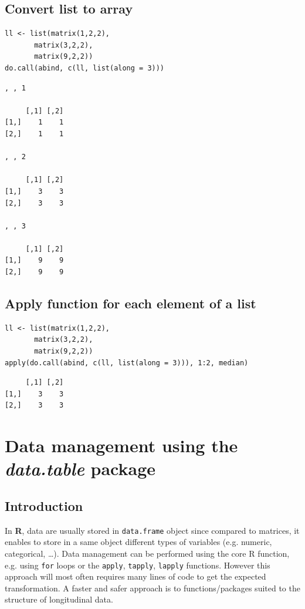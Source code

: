 \documentclass{article}
\newcommand\Rlogo{\textbf{\textsf{R}}\xspace}
\begin{document}
\subsection{Convert list to array}
\label{sec:org980b1db}

\lstset{language=r,label= ,caption= ,captionpos=b,numbers=none}
\begin{lstlisting}
ll <- list(matrix(1,2,2),
	   matrix(3,2,2),
	   matrix(9,2,2))
do.call(abind, c(ll, list(along = 3)))
\end{lstlisting}

\begin{verbatim}
, , 1

     [,1] [,2]
[1,]    1    1
[2,]    1    1

, , 2

     [,1] [,2]
[1,]    3    3
[2,]    3    3

, , 3

     [,1] [,2]
[1,]    9    9
[2,]    9    9
\end{verbatim}

\subsection{Apply function for each element of a list}
\label{sec:org0426606}


\lstset{language=r,label= ,caption= ,captionpos=b,numbers=none}
\begin{lstlisting}
ll <- list(matrix(1,2,2),
	   matrix(3,2,2),
	   matrix(9,2,2))
apply(do.call(abind, c(ll, list(along = 3))), 1:2, median)
\end{lstlisting}

\begin{verbatim}
     [,1] [,2]
[1,]    3    3
[2,]    3    3
\end{verbatim}

\section{Data management using the \emph{data.table} package}
\label{sec:org19e0b31}
\subsection{Introduction}
\label{sec:orgc9a1193}
In \Rlogo, data are usually stored in \texttt{data.frame} object since compared
to matrices, it enables to store in a same object different types of
variables (e.g. numeric, categorical, \ldots{}). Data management can be
performed using the core R function, e.g. using \texttt{for} loops or
the \texttt{apply}, \texttt{tapply}, \texttt{lapply} functions.  However this approach will
most often requires many lines of code to get the expected
transformation.  A faster and safer approach is to functions/packages
suited to the structure of longitudinal data.
\end{document}
